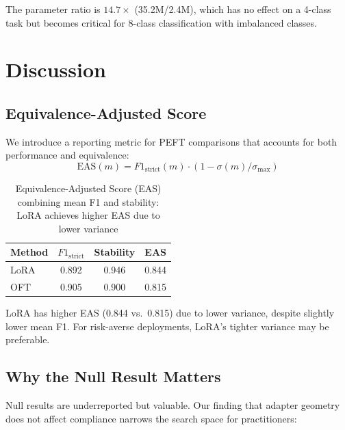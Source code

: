 \documentclass[review,3p]{elsarticle}
\begin{document}
The parameter ratio is $14.7\times$ (35.2M/2.4M), which has no effect on a 4-class task but becomes critical for 8-class classification with imbalanced classes.

\section{Discussion}

\subsection{Equivalence-Adjusted Score}
We introduce a reporting metric for PEFT comparisons that accounts for both performance and equivalence:
\begin{equation}
\text{EAS}(m) = F1_\text{strict}(m) \cdot (1 - \sigma(m) / \sigma_\text{max})
\end{equation}

\begin{table}[!ht]
\centering\caption{Equivalence-Adjusted Score (EAS) combining mean F1 and stability: LoRA achieves higher EAS due to lower variance}
\label{tab:eas}
\begin{tabular}{lccc}
\toprule
\textbf{Method} & $F1_\text{strict}$ & \textbf{Stability} & \textbf{EAS} \\
\midrule
LoRA & 0.892 & 0.946 & 0.844 \\
OFT  & 0.905 & 0.900 & 0.815 \\
\bottomrule
\end{tabular}
\end{table}

LoRA has higher EAS (0.844 vs.\ 0.815) due to lower variance, despite slightly lower mean F1. For risk-averse deployments, LoRA's tighter variance may be preferable.

\subsection{Why the Null Result Matters}
Null results are underreported but valuable. Our finding that adapter geometry does not affect compliance narrows the search space for practitioners:
\end{document}
